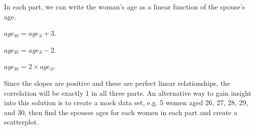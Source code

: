 In each part, we can write the woman's age as a linear function of 
the spouse's age. 
\begin{parts}
\item $age_{W} = age_{S} + 3$. 
\item $age_{W} = age_{S} - 2$. 
\item $age_{W} = 2 \times age_{S}$.
\end{parts} 
Since the slopes are positive and these are perfect linear 
relationships, the correlation will be exactly 1 in all three parts. 
An alternative way to gain insight into this solution is to create a 
mock data set, e.g. 5 women aged 26, 27, 28, 29, and 30, then find the 
spouses ages for each women in each part and create a scatterplot.